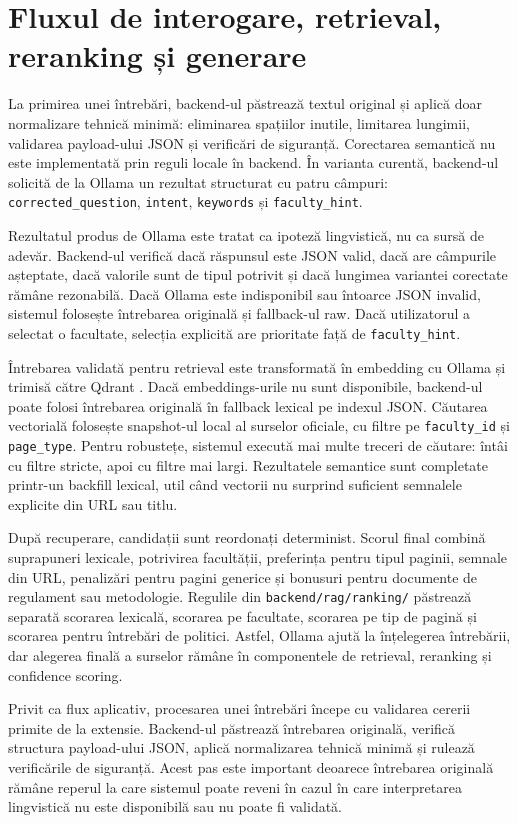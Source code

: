 \documentclass[12pt,a4paper]{report}
\theoremstyle{definition}
\theoremstyle{remark}
\begin{document}
\section{Fluxul de interogare, retrieval, reranking și generare}
La primirea unei întrebări, backend-ul păstrează textul original și aplică doar normalizare tehnică minimă: eliminarea spațiilor inutile, limitarea lungimii, validarea payload-ului JSON și verificări de siguranță. Corectarea semantică nu este implementată prin reguli locale în backend. În varianta curentă, backend-ul solicită de la Ollama un rezultat structurat cu patru câmpuri: \texttt{corrected\_question}, \texttt{intent}, \texttt{keywords} și \texttt{faculty\_hint}.

Rezultatul produs de Ollama este tratat ca ipoteză lingvistică, nu ca sursă de adevăr. Backend-ul verifică dacă răspunsul este JSON valid, dacă are câmpurile așteptate, dacă valorile sunt de tipul potrivit și dacă lungimea variantei corectate rămâne rezonabilă. Dacă Ollama este indisponibil sau întoarce JSON invalid, sistemul folosește întrebarea originală și fallback-ul raw. Dacă utilizatorul a selectat o facultate, selecția explicită are prioritate față de \texttt{faculty\_hint}.

Întrebarea validată pentru retrieval este transformată în embedding cu Ollama și trimisă către Qdrant \cite{OllamaDocs,QdrantDocs}. Dacă embeddings-urile nu sunt disponibile, backend-ul poate folosi întrebarea originală în fallback lexical pe indexul JSON. Căutarea vectorială folosește snapshot-ul local al surselor oficiale, cu filtre pe \texttt{faculty\_id} și \texttt{page\_type}. Pentru robustețe, sistemul execută mai multe treceri de căutare: întâi cu filtre stricte, apoi cu filtre mai largi. Rezultatele semantice sunt completate printr-un backfill lexical, util când vectorii nu surprind suficient semnalele explicite din URL sau titlu.

După recuperare, candidații sunt reordonați determinist. Scorul final combină suprapuneri lexicale, potrivirea facultății, preferința pentru tipul paginii, semnale din URL, penalizări pentru pagini generice și bonusuri pentru documente de regulament sau metodologie. Regulile din \texttt{backend/rag/ranking/} păstrează separată scorarea lexicală, scorarea pe facultate, scorarea pe tip de pagină și scorarea pentru întrebări de politici. Astfel, Ollama ajută la înțelegerea întrebării, dar alegerea finală a surselor rămâne în componentele de retrieval, reranking și confidence scoring.

Privit ca flux aplicativ, procesarea unei întrebări începe cu validarea cererii primite de la extensie. Backend-ul păstrează întrebarea originală, verifică structura payload-ului JSON, aplică normalizarea tehnică minimă și rulează verificările de siguranță. Acest pas este important deoarece întrebarea originală rămâne reperul la care sistemul poate reveni în cazul în care interpretarea lingvistică nu este disponibilă sau nu poate fi validată.
\end{document}
